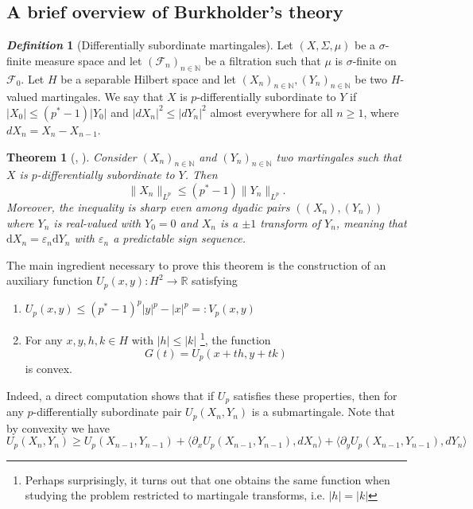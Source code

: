 \documentclass[11pt, a4paper]{amsart}
\newtheorem{theorem}{Theorem}[section]
\theoremstyle{definition}
\newtheorem{definition}{\textsl{Definition}}
\theoremstyle{remark}
\newcommand{\N}{\mathbb{N}}
\begin{document}
\subsection{A brief overview of Burkholder's theory}    
\begin{definition}[Differentially subordinate martingales]
Let $(X,\Sigma, \mu)$ be a $\sigma$-finite measure space
and let $(\mathcal F_n)_{n\in \N}$ be a filtration such that
$\mu$ is $\sigma$-finite on $\mathcal F_0$.
Let $H$ be a separable Hilbert space and let
$(X_n)_{n\in \N},(Y_n)_{n\in \N}$ be two 
$H$-valued martingales.
We say that $X$ is $p$-differentially subordinate
to $Y$ if $|X_0|\le (p^*-1)|Y_0|$ and
$|dX_n|^2\le |dY_n|^2$ almost everywhere
 for all $n\ge 1$, where 
$dX_n=X_{n}-X_{n-1}$.
\end{definition}
\begin{theorem}[{\cite[Theorem 3.5]{osekowski}},
\cite{Burkholder1988Sharp}]
\label{thm:burk}
Consider $(X_n)_{n\in \N}$ and $(Y_n)_{n\in \N}$
two martingales such that
$X$ is $p$-differentially subordinate to $Y$. Then
\begin{equation}
\|X_n\|_{L^p}\le (p^*-1)\|Y_n\|_{L^p}.\label{eq:burk}
\end{equation}
Moreover, the inequality is sharp
even among dyadic pairs $((X_n),(Y_n))$
where $Y_n$ is real-valued with $Y_0=0$ and
$X_n$ is a $\pm1$ transform of $Y_n$,
meaning that
$\mathrm{d}X_n=\varepsilon_n \mathrm{d}Y_n$
with $\varepsilon_n$
a predictable sign sequence.
\end{theorem}
The main ingredient necessary to prove
this theorem is the construction
of an auxiliary function $U_p(x,y)\colon H^2\to \mathbb R$ 
satisfying
\begin{enumerate}
\item $U_p(x,y)\le (p^*-1)^p|y|^p-|x|^p=:V_p(x,y)$
\item For any $x,y,h,k\in H$ with 
$|h|\le |k|$
\footnote{Perhaps surprisingly, it turns out that one
obtains the same function when studying
the problem restricted
to martingale transforms, 
i.e. $|h|=|k|$},
the function
\begin{equation*}
G(t)=U_p(x+th,y+tk)
\end{equation*}
is convex.
\end{enumerate}
Indeed, a direct computation shows that if $U_p$ satisfies
these properties, then for any $p$-differentially
subordinate pair $U_p(X_n,Y_n)$ is a submartingale.
Note that by convexity we have
\begin{equation*}
    U_p(X_n,Y_n)\ge U_p(X_{n-1},Y_{n-1})+
    \langle \partial_xU_p(X_{n-1},Y_{n-1}), dX_{n}\rangle+
    \langle \partial_y U_p(X_{n-1},Y_{n-1}), dY_{n}\rangle
\end{equation*}
\end{document}
